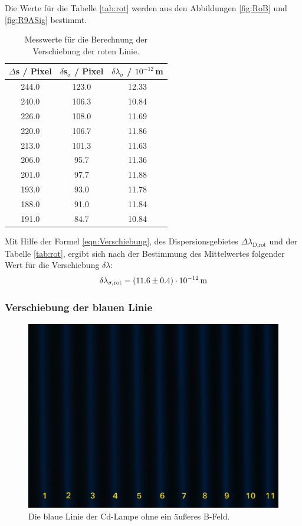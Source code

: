 Die Werte für die Tabelle \eqref{tab:rot} werden aus den Abbildungen \eqref{fig:RoB} und \eqref{fig:R9ASig} bestimmt.

\begin{table}[H]
  \centering
  \caption{Messwerte für die Berechnung der Verschiebung der roten Linie.}
  \label{tab:rot}
  \begin{tabular}{c c c}
    $\Delta$s / Pixel & $\delta$s$_{\sigma}$ / Pixel & $\delta \lambda_{\sigma}$ / $10^{-12}$\,m \\
    \hline
    244.0 & 123.0 & 12.33 \\
    240.0 & 106.3 & 10.84 \\
    226.0 & 108.0 & 11.69 \\
    220.0 & 106.7 & 11.86 \\
    213.0 & 101.3 & 11.63 \\
    206.0 & 95.7  & 11.36 \\
    201.0 & 97.7  & 11.88 \\
    193.0 & 93.0  & 11.78 \\
    188.0 & 91.0  & 11.84 \\
    191.0 & 84.7  & 10.84 \\
    \hline
  \end{tabular}
\end{table}

Mit Hilfe der Formel \eqref{eqn:Verschiebung}, des Dispersionsgebietes $\Delta\lambda_\text{D,rot}$ und der Tabelle \eqref{tab:rot}, ergibt sich nach der Bestimmung des Mittelwertes folgender Wert für die Verschiebung $\delta\lambda$:
\begin{align*}
  \delta \lambda_{\sigma,\text{rot}} = (\num{11.6 +- 0.4})\cdot 10^{-12}\,\text{m} \\
\end{align*}



\subsubsection{Verschiebung der blauen Linie}
\begin{figure}[H]
  \centering
  \includegraphics[width=0.8\linewidth]{Bilder/BoB.JPG}
  \caption{Die blaue Linie der Cd-Lampe ohne ein äußeres B-Feld.}
  \label{fig:BoB}
\end{figure}

